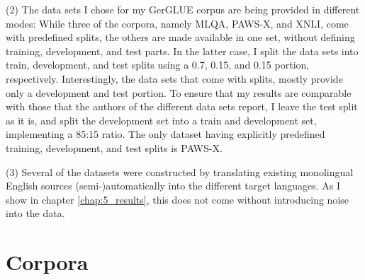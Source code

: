 (2) The data sets I chose for my GerGLUE corpus are being provided in different modes: While
three of the corpora, namely MLQA, PAWS-X, and XNLI, come with predefined splits, the others
are made available in one set, without defining training, development, and test parts. In
the latter case, I split the data sets into train, development, and test splits using a 0.7,
0.15, and 0.15 portion, respectively. Interestingly, the data sets that come with splits,
mostly provide only a development and test portion. To ensure that my results are comparable
with those that the authors of the different data sets report, I leave the test split as it
is, and split the development set into a train and development set, implementing a 85:15
ratio. The only dataset having explicitly predefined training, development, and test splits
is PAWS-X.

(3) Several of the datasets were constructed by translating existing monolingual English sources
(semi-)automatically into the different target languages. As I show in chapter \ref{chap:5_results},
this does not come without introducing noise into the data.





\section{Corpora}

